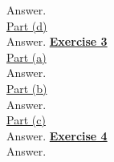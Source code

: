 \documentclass[a4paper, 11pt]{article}
\begin{document}
\newline Answer.\\
\newline \underline{Part (d)}\\
\newline Answer.
\newpage
\textbf{\underline{Exercise 3}}\\
\newline \underline{Part (a)}\\
\newline Answer.\\
\newline \underline{Part (b)}\\
\newline Answer.\\
\newline \underline{Part (c)}\\
\newline Answer.
\newpage
\textbf{\underline{Exercise 4}}\\
\newline Answer.
\end{document}

